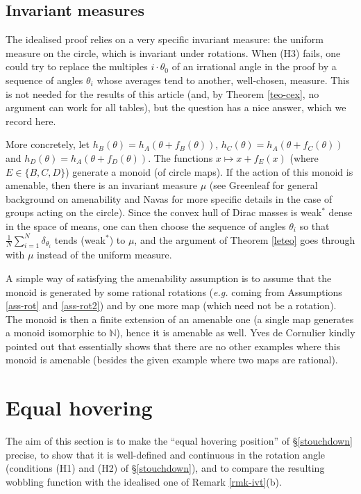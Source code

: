 \documentclass[a4paper,11pt,twoside,leqno]{article}
\newcommand{\eg}[0]{\emph{e.g.} }
\numberwithin{equation}{section}
\begin{document}
\subsection{Invariant measures}\label{sinvmeas}

The idealised proof relies on a very specific invariant measure: the uniform measure on the circle, which is invariant under rotations. When (H3) fails, one could try to replace the multiples $i \cdot \theta_0$ of an irrational angle in the proof by a sequence of angles $\theta_i$ whose averages tend to another, well-chosen, measure. This is not needed for the results of this article (and, by Theorem \ref{teo-cex}, no argument can work for all tables), but the question has a nice answer, which we record here.

More concretely, let $h_B(\theta) = h_A(\theta + f_B(\theta))$, $h_C(\theta) = h_A(\theta + f_C(\theta))$ and $h_D(\theta) = h_A(\theta + f_D(\theta))$. The functions $x \mapsto x + f_E(x)$ (where $E \in \{B,C,D\}$) generate a monoid (of circle maps). If the action of this monoid is amenable, then there is an invariant measure $\mu$ (see Greenleaf \cite{Gr} for general background on amenability and Navas \cite[\S{}2.3 and \S{}3.2]{Nav} for more specific details in the case of groups acting on the circle). Since the convex hull of Dirac masses is weak$^*$ dense in the space of means, one can then choose the sequence of angles $\theta_i$ so that $\tfrac{1}{N}\sum_{i=1}^N \delta_{\theta_i}$ tends (weak$^*$) to $\mu$, and the argument of Theorem \ref{leteo} goes through with $\mu$ instead of the uniform measure.

A simple way of satisfying the amenability assumption is to assume that the monoid is generated by some rational rotations (\eg coming from Assumptions \ref{ass-rot} and \ref{ass-rot2}) and by one more map (which need not be a rotation). The monoid is then a finite extension of an amenable one (a single map generates a monoid isomorphic to $\mathbb{N}$), hence it is amenable as well. Yves de Cornulier \cite{Cor} kindly pointed out that \cite{Nav} essentially shows that there are no other examples where this monoid is amenable (besides the given example where two maps are rational).


\section{Equal hovering}\label{s-transv}

The aim of this section is to make the ``equal hovering position'' of \S{}\ref{stouchdown} precise, to show that it is well-defined and continuous in the rotation angle (conditions (H1) and (H2) of \S{}\ref{stouchdown}), and to compare the resulting wobbling function with the idealised one of Remark \ref{rmk-ivt}(b).
\end{document}
